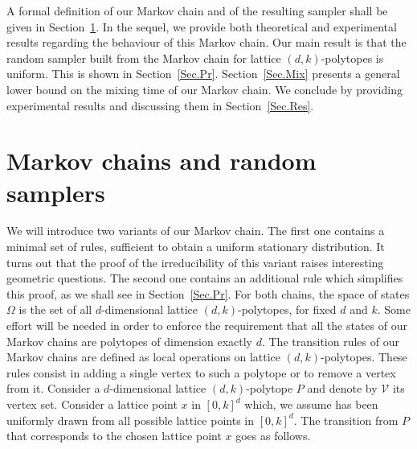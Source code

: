 \documentclass[a4paper]{article}
\begin{document}
A formal definition of our Markov chain and of the resulting sampler shall be given in Section~\ref{Sec.MC}. In the sequel, we provide both theoretical and experimental results regarding the behaviour of this Markov chain. Our main result is that the random sampler built from the Markov chain for lattice $(d,k)$-polytopes is uniform. This is shown in Section~\ref{Sec.Pr}. Section~\ref{Sec.Mix} presents a general lower bound on the mixing time of our Markov chain. We conclude by providing experimental results and discussing them in Section~\ref{Sec.Res}.

\section{Markov chains and random samplers}\label{Sec.MC}

We will introduce two variants of our Markov chain. The first one contains a minimal set of rules, sufficient to obtain a uniform stationary distribution. It turns out that the proof of the irreducibility of this variant raises interesting geometric questions. The second one contains an additional rule which simplifies this proof, as we shall see in Section~\ref{Sec.Pr}. For both chains, the space of states $\Omega$ is the set of all $d$-dimensional lattice $(d,k)$-polytopes, for fixed $d$ and $k$. Some effort will be needed in order to enforce the requirement that all the states of our Markov chains are polytopes of dimension exactly $d$. The transition rules of our Markov chains are defined as local operations on lattice $(d,k)$-polytopes. These rules consist in adding a single vertex to such a polytope or to remove a vertex from it. Consider a $d$-dimensional lattice $(d,k)$-polytope $P$ and denote by $\mathcal{V}$ its vertex set. Consider a lattice point $x$ in $[0,k]^d$ which, we assume has been uniformly drawn from all possible lattice points in $[0,k]^d$. The transition from $P$ that corresponds to the chosen lattice point $x$ goes as follows.
\end{document}
